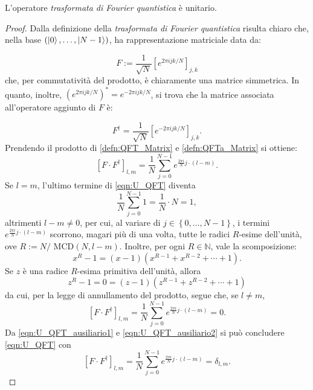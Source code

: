 \begin{lem}
 L'operatore \textit{trasformata di Fourier quantistica} è unitario.
\end{lem}
\begin{proof}
 Dalla definizione della \textit{trasformata di Fourier quantistica} risulta chiaro che, nella base $\left(\ket{0}, \dotsc, \ket{N-1}\right)$, ha rappresentazione matriciale data da:
 
 \begin{equation}\label{defn:QFT_Matrix}
  F := \frac{1}{\sqrt{N}} \left[e^{2 \pi i j k / N} \right]_{j,k}
 \end{equation}
 che, per commutatività del prodotto, è chiaramente una matrice simmetrica. 
 In quanto, inoltre, $(e^{2 \pi i j k / N})^* = e^{-2 \pi i j k / N}$, si trova che la matrice associata all'operatore aggiunto di $F$ è:
 
 \begin{equation}\label{defn:QFTa_Matrix}
  F^\dag = \frac{1}{\sqrt{N}} \left[e^{-2 \pi i j k / N} \right]_{j,k}.
 \end{equation}
 Prendendo il prodotto di \eqref{defn:QFT_Matrix} e \eqref{defn:QFTa_Matrix} si ottiene:
 \begin{equation}\label{eqn:U_QFT}
 \left[F \cdot F^{\dagger} \right]_{l,m} = \frac{1}{N} \sum_{j=0}^{N-1} e^{\frac{2 \pi i}{N} j \cdot \left(l - m \right)}.
 \end{equation}
 Se $l = m$, l'ultimo termine di \eqref{eqn:U_QFT} diventa 
 \begin{equation}\label{eqn:U_QFT_ausiliario1}
  {\frac{1}{N} \sum_{j=0}^{N-1} 1} = \frac{1}{N} \cdot N = 1,
 \end{equation}
 altrimenti ${l - m \neq 0}$, per cui, al variare di ${j \in \left\{0, \dotsc, N-1 \right\}}$, i termini $e^{\frac{2 \pi i}{N} j \cdot \left(l - m \right)}$ scorrono, magari più di una volta, tutte le radici $R$-esime dell'unità, ove $R := N /$ MCD$\left(N,l-m\right)$. Inoltre, per ogni $R \in \mathbb{N}$, vale la scomposizione:
 \begin{equation}
  x^{R} - 1 = (x - 1) (x^{R - 1} + x^{R - 2} + \dotsb + 1).
 \end{equation}
 Se $z$ è una radice $R$-esima primitiva dell'unità, allora
 \begin{equation}\label{eqn:Sum_Rth_1_rad}
  z^R - 1 = 0 = (z - 1) (z^{R - 1} + z^{R - 2} + \dotsb + 1)
 \end{equation}
 da cui, per la legge di annullamento del prodotto, segue che, se $l \neq m$, 
 \begin{equation}\label{eqn:U_QFT_ausiliario2}
  \left[F \cdot F^\dag \right]_{l,m} = \frac{1}{N} \sum_{j=0}^{N-1} e^{\frac{2 \pi i}{N} j \cdot \left(l - m \right)} = 0.
 \end{equation}
 Da \eqref{eqn:U_QFT_ausiliario1} e \eqref{eqn:U_QFT_ausiliario2} si può concludere \eqref{eqn:U_QFT} con
 \begin{equation}\label{eqn:U_QFT2}
 \left[F \cdot F^\dag \right]_{l,m} = \frac{1}{N} \sum_{j=0}^{N-1} e^{\frac{2 \pi i}{N} j \cdot \left(l - m \right)} = \delta_{l,m}.
 \end{equation}
 

\end{proof}

